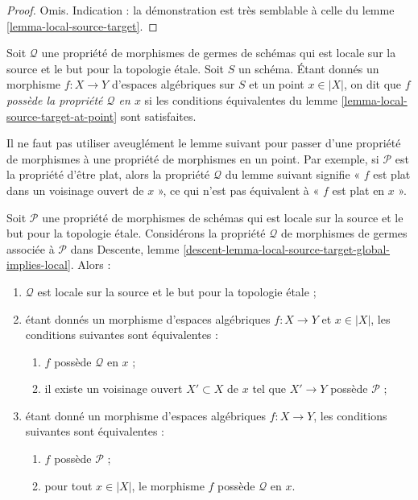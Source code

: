 \begin{proof}
Omis. Indication : la démonstration est très semblable à celle du
lemme \ref{lemma-local-source-target}.
\end{proof}

\begin{definition}
\label{definition-P-at-point}
Soit $\mathcal{Q}$ une propriété de morphismes de germes
de schémas qui est locale sur la source et le but pour la topologie étale.
Soit $S$ un schéma.
Étant donnés un morphisme $f : X \to Y$ d'espaces algébriques sur $S$ et
un point $x \in |X|$, on dit que $f$
{\it possède la propriété $\mathcal{Q}$ en $x$} si les conditions équivalentes du
lemme \ref{lemma-local-source-target-at-point}
sont satisfaites.
\end{definition}

\noindent
Il ne faut pas utiliser aveuglément le lemme suivant pour passer d'une propriété
de morphismes à une propriété de morphismes en un point. Par exemple, si
$\mathcal{P}$ est la propriété d'être plat, alors la propriété
$\mathcal{Q}$ du lemme suivant signifie « $f$ est plat dans un voisinage ouvert
de $x$ », ce qui n'est pas équivalent à « $f$ est plat en $x$ ».

\begin{lemma}
\label{lemma-local-source-target-global-implies-local}
Soit $\mathcal{P}$ une propriété de morphismes de schémas
qui est locale sur la source et le but pour la topologie étale.
Considérons la propriété $\mathcal{Q}$ de morphismes
de germes associée à $\mathcal{P}$ dans
Descente, lemme \ref{descent-lemma-local-source-target-global-implies-local}.
Alors :
\begin{enumerate}
\item $\mathcal{Q}$ est locale sur la source et le but pour la topologie étale ;
\item étant donnés un morphisme d'espaces algébriques $f : X \to Y$ et $x \in |X|$,
les conditions suivantes sont équivalentes :
\begin{enumerate}
\item $f$ possède $\mathcal{Q}$ en $x$ ;
\item il existe un voisinage ouvert $X' \subset X$ de $x$
tel que $X' \to Y$ possède $\mathcal{P}$ ;
\end{enumerate}
\item étant donné un morphisme d'espaces algébriques $f : X \to Y$,
les conditions suivantes sont équivalentes :
\begin{enumerate}
\item $f$ possède $\mathcal{P}$ ;
\item pour tout $x \in |X|$, le morphisme $f$ possède $\mathcal{Q}$ en $x$.
\end{enumerate}
\end{enumerate}
\end{lemma}

